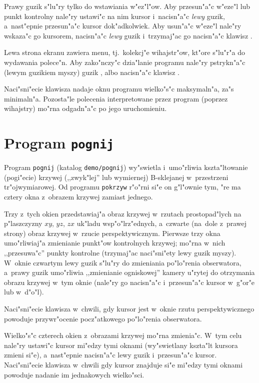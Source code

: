 Prawy guzik s"lu"ry tylko do wstawiania w"ez"l"ow. Aby przesun"a"c w"eze"l
lub punkt kontrolny nale"ry ustawi"c na nim kursor i~nacisn"a"c \emph{lewy}
guzik, a~nast"epnie przesun"a"c kursor dok"adkolwiek. Aby usun"a"c w"eze"l
nale"ry wskaza"c go kursorem, nacisn"a"c \emph{lewy} guzik i~trzymaj"ac go
nacisn"a"c klawisz .

Lewa strona ekranu zawiera menu, tj.\ kolekcj"e wihajstr"ow, kt"ore s"lu"r"a
do wydawania polece"n. Aby zako"nczy"c dzia"lanie programu nale"ry
pstrykn"a"c (lewym guzikiem myszy) guzik , albo
nacisn"a"c klawisz .

Naci"sni"ecie klawisza  nadaje oknu programu wielko"s"c
maksymaln"a, za"s  minimaln"a. Pozosta"le polecenia
interpretowane przez program (poprzez wihajstry) mo"rna odgadn"a"c po jego
uruchomieniu.


\section{Program \texttt{pognij}}

Program \texttt{pognij} (katalog \texttt{demo/pognij}) wy"swietla
i~umo"rliwia kszta"ltowanie (pogi"ecie) krzywej (,,zwyk"lej'' lub wymiernej)
B-sklejanej w~przestrzeni tr"ojwymiarowej. Od programu \texttt{pokrzyw}
r"o"rni si"e on g"l"ownie tym, "re ma cztery okna z~obrazem krzywej
zamiast jednego.

Trzy z~tych okien przedstawiaj"a obraz krzywej w~rzutach prostopad"lych na
p"laszczyzny $xy$, $yz$, $zx$ uk"ladu wsp"o"lrz"ednych, a~czwarte (na~dole
z~prawej strony) obraz krzywej w~rzucie perspektywicznym. Pierwsze trzy okna
umo"rliwiaj"a zmienianie punkt"ow kontrolnych krzywej; mo"rna w~nich
,,przesuwa"c'' punkty kontrolne (trzymaj"ac naci"sni"ety lewy guzik myszy).
W~oknie czwartym lewy guzik s"lu"ry do zmieniania po"lo"renia obserwatora,
a~prawy guzik umo"rliwia ,,zmienianie ogniskowej'' kamery u"rytej do
otrzymania obrazu krzywej w~tym oknie (nale"ry go nacisn"a"c i~przesun"a"c
kursor w~g"or"e lub w~d"o"l).

Naci"sni"ecie klawisza  w~chwili, gdy kursor jest
w~oknie rzutu perspektywicznego powoduje przywr"ocenie pocz"atkowego
po"lo"renia obserwatora.

Wielko"s"c czterech okien z~obrazami krzywej mo"rna zmienia"c. W~tym celu
nale"ry ustawi"c kursor mi"edzy tymi oknami (wy"swietlany kszta"lt kursora
zmieni si"e), a~nast"epnie nacisn"a"c lewy guzik i~przesun"a"c kursor.
Naci"sni"ecie klawisza  w~chwili gdy kursor znajduje
si"e mi"edzy tymi oknami powoduje nadanie im jednakowych wielko"sci.

